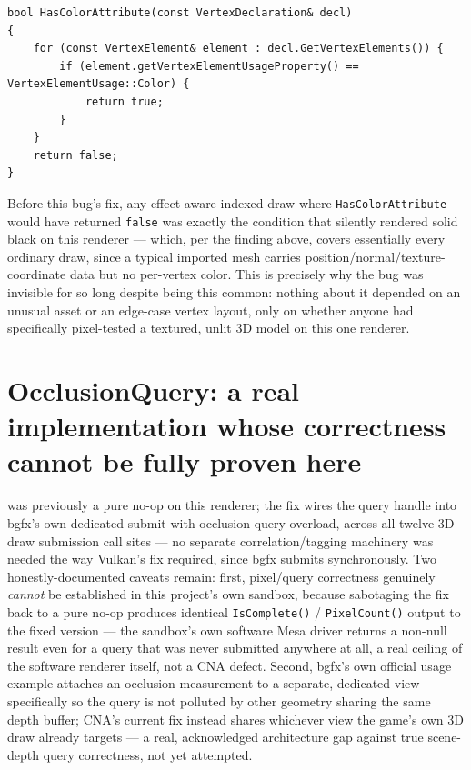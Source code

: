 \begin{lstlisting}
bool HasColorAttribute(const VertexDeclaration& decl)
{
    for (const VertexElement& element : decl.GetVertexElements()) {
        if (element.getVertexElementUsageProperty() == VertexElementUsage::Color) {
            return true;
        }
    }
    return false;
}
\end{lstlisting}

Before this bug's fix, any effect-aware indexed draw where \texttt{HasColorAttribute} would
have returned \texttt{false} was exactly the condition that silently rendered solid black on
this renderer --- which, per the finding above, covers essentially every ordinary
 draw, since a typical imported mesh carries position/normal/texture-coordinate
data but no per-vertex color. This is precisely why the bug was invisible for so long despite
being this common: nothing about it depended on an unusual asset or an edge-case vertex
layout, only on whether anyone had specifically pixel-tested a textured, unlit 3D model on
this one renderer.

\section[OcclusionQuery: a real implementation, correctness not provable here]{OcclusionQuery: a real implementation whose correctness cannot be fully proven here}

 was previously a pure no-op on this renderer; the fix wires the
query handle into bgfx's own dedicated submit-with-occlusion-query overload, across all
twelve 3D-draw submission call sites --- no separate correlation/tagging machinery was
needed the way Vulkan's fix required, since bgfx submits synchronously. Two honestly-documented
caveats remain: first, pixel/query correctness genuinely \emph{cannot} be established in this
project's own sandbox, because sabotaging the fix back to a pure no-op produces identical
\texttt{IsComplete()} / \texttt{PixelCount()} output to the fixed version --- the sandbox's own
software Mesa driver returns a non-null result even for a query that was never submitted
anywhere at all, a real ceiling of the software renderer itself, not a CNA defect. Second,
bgfx's own official usage example attaches an occlusion measurement to a separate, dedicated
view specifically so the query is not polluted by other geometry sharing the same depth
buffer; CNA's current fix instead shares whichever view the game's own 3D draw already
targets --- a real, acknowledged architecture gap against true scene-depth query correctness,
not yet attempted.

